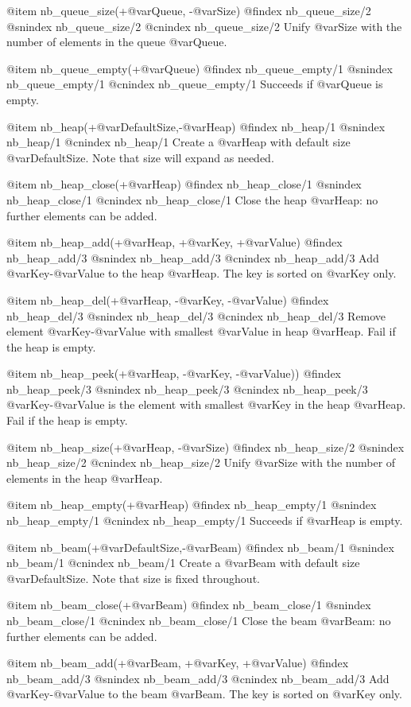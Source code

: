 {{{{{{{{@item nb_queue_size(+@var{Queue}, -@var{Size})
@findex nb_queue_size/2
@snindex nb_queue_size/2
@cnindex nb_queue_size/2
Unify @var{Size} with the number of elements in the queue  @var{Queue}.

@item nb_queue_empty(+@var{Queue})
@findex nb_queue_empty/1
@snindex nb_queue_empty/1
@cnindex nb_queue_empty/1
Succeeds if  @var{Queue} is empty.

@item nb_heap(+@var{DefaultSize},-@var{Heap})
@findex nb_heap/1
@snindex nb_heap/1
@cnindex nb_heap/1
Create a @var{Heap} with default size @var{DefaultSize}. Note that size
will expand as needed.

@item nb_heap_close(+@var{Heap})
@findex nb_heap_close/1
@snindex nb_heap_close/1
@cnindex nb_heap_close/1
Close the heap @var{Heap}: no further elements can be added.

@item nb_heap_add(+@var{Heap}, +@var{Key}, +@var{Value})
@findex nb_heap_add/3
@snindex nb_heap_add/3
@cnindex nb_heap_add/3
Add @var{Key}-@var{Value} to the heap @var{Heap}. The key is sorted on
@var{Key} only.

@item nb_heap_del(+@var{Heap}, -@var{Key}, -@var{Value})
@findex nb_heap_del/3
@snindex nb_heap_del/3
@cnindex nb_heap_del/3
Remove element @var{Key}-@var{Value} with smallest @var{Value} in heap
@var{Heap}. Fail if the heap is empty.

@item nb_heap_peek(+@var{Heap}, -@var{Key}, -@var{Value}))
@findex nb_heap_peek/3
@snindex nb_heap_peek/3
@cnindex nb_heap_peek/3
@var{Key}-@var{Value} is the element with smallest @var{Key} in the heap
@var{Heap}. Fail if the heap is empty.

@item nb_heap_size(+@var{Heap}, -@var{Size})
@findex nb_heap_size/2
@snindex nb_heap_size/2
@cnindex nb_heap_size/2
Unify @var{Size} with the number of elements in the heap  @var{Heap}.

@item nb_heap_empty(+@var{Heap})
@findex nb_heap_empty/1
@snindex nb_heap_empty/1
@cnindex nb_heap_empty/1
Succeeds if  @var{Heap} is empty.

@item nb_beam(+@var{DefaultSize},-@var{Beam})
@findex nb_beam/1
@snindex nb_beam/1
@cnindex nb_beam/1
Create a @var{Beam} with default size @var{DefaultSize}. Note that size
is fixed throughout.

@item nb_beam_close(+@var{Beam})
@findex nb_beam_close/1
@snindex nb_beam_close/1
@cnindex nb_beam_close/1
Close the beam @var{Beam}: no further elements can be added.

@item nb_beam_add(+@var{Beam}, +@var{Key}, +@var{Value})
@findex nb_beam_add/3
@snindex nb_beam_add/3
@cnindex nb_beam_add/3
Add @var{Key}-@var{Value} to the beam @var{Beam}. The key is sorted on
@var{Key} only.

}}}}}}}}
